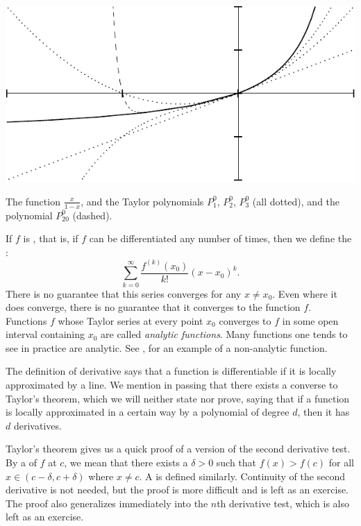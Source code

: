 \begin{myfigureht}
\includegraphics{figures/taylorgeom}
\caption{The function $\frac{x}{1-x}$, and the Taylor polynomials
$P_1^0$, $P_2^0$, $P_3^0$ (all dotted), and the polynomial $P_{20}^0$
(dashed).\label{fig:taylorgeom}}
\end{myfigureht}

If $f$ is \emph{},
that is, if $f$ can be
differentiated any number of times, then 
we define the \emph{}:
\begin{equation*}
\sum_{k=0}^\infty
\frac{f^{(k)}(x_0)}{k!}{(x-x_0)}^k .
\end{equation*}
There is no guarantee that this series converges for any
$x \not= x_0$.  Even where it does converge, there is no guarantee
that it converges to the function $f$.  Functions $f$
whose Taylor series at every point $x_0$
converges to $f$ in some open interval containing $x_0$
are called
\emph{analytic functions}.
Many functions one tends to see in practice are analytic.
See , for an example of a non-analytic
function.

\medskip

The definition of derivative says that
a function is
differentiable if it
is locally approximated by a line.
We mention in passing that there exists a converse to Taylor's
theorem,
which we will neither state nor prove,
saying that if a function is
locally approximated in a certain way by a polynomial of degree $d$, then it
has $d$ derivatives.

\medskip

Taylor's theorem gives us a quick proof of a version of
the second derivative test.
By a \emph{}
of $f$ at $c$,
we mean that there exists a $\delta > 0$ such that $f(x) > f(c)$ for
all $x \in (c-\delta,c+\delta)$ where $x\not=c$.
A \emph{}
is defined similarly.
Continuity of the second derivative is not needed, but the proof is more
difficult and is left as an exercise.  The proof also generalizes
immediately into the $n$th derivative test, which is also left as
an exercise.

